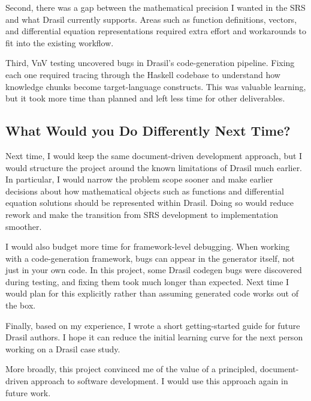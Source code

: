 \documentclass{article}
\begin{document}
Second, there was a gap between the mathematical precision I wanted in
the SRS and what Drasil currently supports. Areas such as function
definitions, vectors, and differential equation representations
required extra effort and workarounds to fit into the existing
workflow.

Third, VnV testing uncovered bugs in Drasil's code-generation
pipeline. Fixing each one required tracing through the Haskell
codebase to understand how knowledge chunks become target-language
constructs. This was valuable learning, but it took more time than
planned and left less time for other deliverables.

\subsection{What Would you Do Differently Next Time?}

  Next time, I would keep the same document-driven development approach,
  but I would structure the project around the known limitations of Drasil
  much earlier. In particular, I would narrow the problem scope sooner and
  make earlier decisions about how mathematical objects such as functions
  and differential equation solutions should be represented within Drasil.
  Doing so would reduce rework and make the transition from SRS
  development to implementation smoother.

  I would also budget more time for framework-level debugging. When
  working with a code-generation framework, bugs can appear in the
  generator itself, not just in your own code. In this project, some
  Drasil codegen bugs were discovered during testing, and fixing them
  took much longer than expected. Next time I would plan for this
  explicitly rather than assuming generated code works out of the box.

  Finally, based on my experience, I wrote a short getting-started guide
  for future Drasil authors. I hope it can reduce the initial learning curve for the next
  person working on a Drasil case study.

  More broadly, this project convinced me of the value of a principled,
  document-driven approach to software development. I would use this
  approach again in future work.
\end{document}
